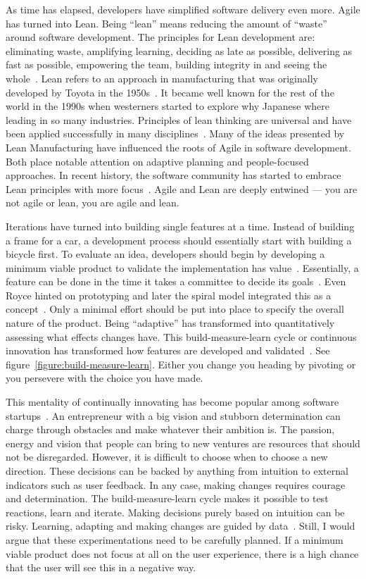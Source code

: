 \documentclass[english]{tktltiki2}
\begin{document}
As time has elapsed, developers have simplified software delivery even more. Agile has turned into Lean. Being “lean” means reducing the amount of “waste” around software development. The principles for Lean development are: eliminating waste, amplifying learning, deciding as late as possible, delivering as fast as possible, empowering the team, building integrity in and seeing the whole~\cite{DD08}. Lean refers to an approach in manufacturing that was originally developed by Toyota in the 1950s~\cite{Fow08}. It became well known for the rest of the world in the 1990s when westerners started to explore why Japanese where leading in so many industries. Principles of lean thinking are universal and have been applied successfully in many disciplines~\cite{Pop02}. Many of the ideas presented by Lean Manufacturing have influenced the roots of Agile in software development. Both place notable attention on adaptive planning and people-focused approaches. In recent history, the software community has started to embrace Lean principles with more focus~\cite{Fow08}. Agile and Lean are deeply entwined — you are not agile or lean, you are agile and lean.

Iterations have turned into building single features at a time. Instead of building a frame for a car, a development process should essentially start with building a bicycle first. To evaluate an idea, developers should begin by developing a minimum viable product to validate the implementation has value~\cite{Rie11}. Essentially, a feature can be done in the time it takes a committee to decide its goals~\cite{Pop02}. Even Royce hinted on prototyping and later the spiral model integrated this as a concept~\cite{Roy70, Boe88}. Only a minimal effort should be put into place to specify the overall nature of the product. Being “adaptive” has transformed into quantitatively assessing what effects changes have. This build-measure-learn cycle or continuous innovation has transformed how features are developed and validated~\cite{Rie11}. See figure~\ref{figure:build-measure-learn}. Either you change you heading by pivoting or you persevere with the choice you have made.

This mentality of continually innovating has become popular among software startups~\cite{Rie11}. An entrepreneur with a big vision and stubborn determination can charge through obstacles and make whatever their ambition is. The passion, energy and vision that people can bring to new ventures are resources that should not be disregarded. However, it is difficult to choose when to choose a new direction. These decisions can be backed by anything from intuition to external indicators such as user feedback. In any case, making changes requires courage and determination. The build-measure-learn cycle makes it possible to test reactions, learn and iterate. Making decisions purely based on intuition can be risky. Learning, adapting and making changes are guided by data~\cite{Rie11}. Still, I would argue that these experimentations need to be carefully planned. If a minimum viable product does not focus at all on the user experience, there is a high chance that the user will see this in a negative way.
\end{document}
